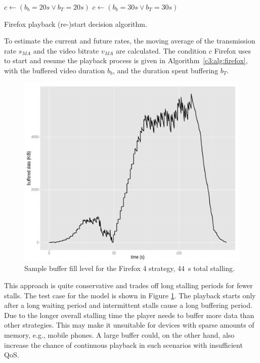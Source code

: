 \begin{algorithm}[htb]
	\centering
	\begin{algorithmic}
		\STATE $c \gets ( b_b=20s \lor b_T=20s )$
	\ELSE
		\STATE $c \gets ( b_b=30s \lor b_T=30s )$
	\ENDIF
	\end{algorithmic}
	\caption{Firefox playback (re-)start decision algorithm.}
\label{c3:alg:firefox}
\end{algorithm}

To estimate the current and future rates, the moving average of the transmission rate $s_{MA}$ and the video bitrate $v_{MA}$ are calculated. The condition $c$ Firefox uses to start and resume the playback process is given in Algorithm~\ref{c3:alg:firefox}, with the buffered video duration $b_b$, and the duration spent buffering $b_T$.

 \begin{figure}[htb]
	\centering
	\includegraphics[width=1.0\textwidth]{images/R-bufferlevel-firefox.pdf}
	\caption{Sample buffer fill level for the Firefox 4 strategy, \SI{44}{\second} total stalling.}
\label{c3:fig:bufferlevel-firefox}
\end{figure}

This approach is quite conservative and trades off long stalling periods for fewer stalls. The test case for the model is shown in Figure \ref{c3:fig:bufferlevel-firefox}. The playback starts only after a long waiting period and intermittent stalls cause a long buffering period. Due to the longer overall stalling time the player needs to buffer more data than other strategies. This may make it unsuitable for devices with sparse amounts of memory, e.g., mobile phones. A large buffer could, on the other hand, also increase the chance of continuous playback in such scenarios with insufficient \gls{QoS}.



